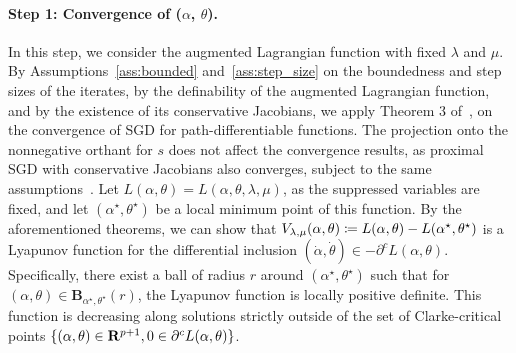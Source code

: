 \documentclass[11pt]{article}
\newcommand{\bsnote}[1]{\noindent\textcolor{red}{\texttt{Bartolomeo: #1}}}
\begin{document}
\begin{appendices}
\paragraph{Step 1: Convergence of ($\alpha$,  $\theta$).}  In this step, we consider the augmented Lagrangian function with fixed $\lambda$ and $\mu$.
By Assumptions~\ref{ass:bounded} and~\ref{ass:step_size} on the boundedness and step sizes of the iterates, by the definability of the augmented Lagrangian function, and by the existence of its conservative Jacobians, we apply Theorem 3 of~\cite{path-diff}, on the convergence of SGD for path-differentiable functions.
The projection onto the nonnegative orthant for $s$ does not affect the convergence results, as proximal SGD with conservative Jacobians also converges, subject to the same assumptions~\citep[Theorem 6.2]{Davis}.
Let $L(\alpha,\theta) = L(\alpha,\theta,\lambda,\mu)$, as the suppressed variables are fixed, and let $(\alpha^\star,\theta^\star)$ be a 
local 
minimum point of this function.
By the aforementioned theorems, we can show
that 
$V_{\lambda,\mu}(\alpha,\theta) \coloneqq L(\alpha,\theta) - L(\alpha^\star,\theta^\star)$ is a Lyapunov function for the differential inclusion $(\dot{\alpha},\dot{\theta}) \in -\partial^cL(\alpha,\theta)$. 
Specifically, there exist a ball of radius $r$ around $(\alpha^\star,\theta^\star)$ such that for $(\alpha,\theta) \in \mathbf{B}_{\alpha^\star,\theta^\star}(r)$, the Lyapunov function is locally positive definite. 
This function is decreasing along solutions strictly outside of the set of Clarke-critical points $\{(\alpha,\theta) \in {\mathbf R}^{p+1}, 0 \in \partial^c L(\alpha,\theta)\}$.

\end{appendices}
\end{document}
